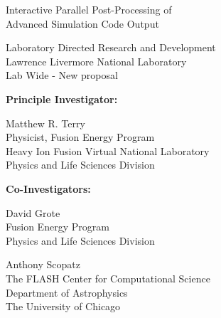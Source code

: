 \documentclass[letterpaper,12pt]{article}
\begin{document}
\begin{center}
	\LARGE
	\color{red}
	Interactive Parallel Post-Processing of \\
	Advanced Simulation Code Output
\end{center}

\vspace{0.5in}

\setlength{\parindent}{0pt}
\large
Laboratory Directed Research and Development \\
Lawrence Livermore National Laboratory \\
Lab Wide - New proposal

\normalsize
\begin{multicols}{2}
\textbf{Principle Investigator:}
\columnbreak

Matthew R. Terry \\
Physicist, Fusion Energy Program \\
Heavy Ion Fusion Virtual National Laboratory \\
Physics and Life Sciences Division

\end{multicols}


\textbf{Co-Investigators:}
\begin{multicols}{2}
	David Grote \\
	Fusion Energy Program \\
	Physics and Life Sciences Division\\
	\columnbreak
			
	Anthony Scopatz \\
	The FLASH Center for Computational Science \\
	Department of Astrophysics \\
	The University of Chicago \\
\end{multicols}



\end{document}
